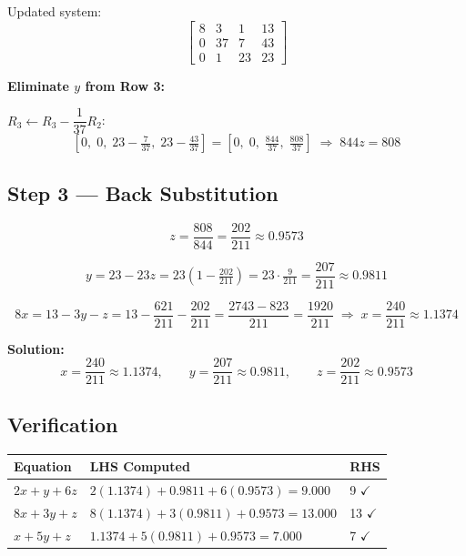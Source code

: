 \documentclass[12pt]{article}
\newcommand{\hcell}[1]{\textbf{\color{white}#1}}
\begin{document}
Updated system:
\[
\left[\begin{array}{rrr|r}
  8 & 3  & 1  & 13 \\
  0 & 37 & 7  & 43 \\
  0 & 1  & 23 & 23
\end{array}\right]
\]

\medskip
\noindent\textbf{Eliminate $y$ from Row 3:}

$R_3 \leftarrow R_3 - \dfrac{1}{37}R_2$:
\[
  \left[0,\;0,\;23-\tfrac{7}{37},\;23-\tfrac{43}{37}\right]
  = \left[0,\;0,\;\tfrac{844}{37},\;\tfrac{808}{37}\right]
  \;\Rightarrow\; 844z = 808
\]

\subsection*{Step 3 --- Back Substitution}

\[
  z = \frac{808}{844} = \frac{202}{211} \approx \mathbf{0.9573}
\]

\[
  y = 23 - 23z = 23\!\left(1 - \tfrac{202}{211}\right) = 23\cdot\tfrac{9}{211} = \frac{207}{211} \approx \mathbf{0.9811}
\]

\[
  8x = 13 - 3y - z = 13 - \frac{621}{211} - \frac{202}{211} = \frac{2743-823}{211} = \frac{1920}{211}
  \;\Rightarrow\;
  x = \frac{240}{211} \approx \mathbf{1.1374}
\]

\begin{formulabox}
\textbf{Solution:}
\[
  x = \frac{240}{211} \approx 1.1374, \qquad
  y = \frac{207}{211} \approx 0.9811, \qquad
  z = \frac{202}{211} \approx 0.9573
\]
\end{formulabox}

\subsection*{Verification}

\begin{center}
\begin{tabular}{C{3.5cm} C{4.5cm} C{1.5cm}}
\toprule
{}
\hcell{Equation} & \hcell{LHS Computed} & \hcell{RHS} \\
\midrule
{}
$2x+y+6z$ & $2(1.1374)+0.9811+6(0.9573)=9.000$ & 9 $\checkmark$ \\
$8x+3y+z$ & $8(1.1374)+3(0.9811)+0.9573=13.000$ & 13 $\checkmark$ \\
$x+5y+z$  & $1.1374+5(0.9811)+0.9573=7.000$ & 7 $\checkmark$ \\
\bottomrule
\end{tabular}
\end{center}
\end{document}
